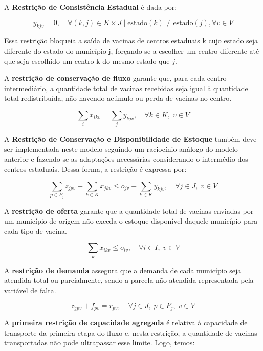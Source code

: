 A \textbf{Restrição de Consistência Estadual} é dada por:

\[
y_{kjv} = 0, \quad \forall (k, j) \in K \times J \mid \text{estado}(k) \neq \text{estado}(j), \forall v \in V
\]

Essa restrição bloqueia a saída de vacinas de centros estaduais {k} cujo estado seja diferente do estado do município {j}, forçando-se a escolher um centro diferente até que seja escolhido um centro {k} do mesmo estado que $j$.

A \textbf{restrição de conservação de fluxo} garante que, para cada centro intermediário, a quantidade total de vacinas recebidas seja igual à quantidade total redistribuída, não havendo acúmulo ou perda de vacinas no centro.

\begin{equation*}
\sum_{i} x_{ikv} = \sum_{j} y_{kjv}, \quad \forall k \in K,\; v \in V
\end{equation*}

A \textbf{Restrição de Conservação e Disponibilidade de Estoque} também deve ser implementada neste modelo seguindo um raciocínio análogo do modelo anterior e fazendo-se as adaptações necessárias considerando o intermédio dos centros estaduais. Dessa forma, a restrição é expressa por:

\begin{equation*}
\sum_{p \in P_j} z_{jpv} + \sum_{k \in K} x_{jkv} \le o_{jv} + \sum_{k \in K} y_{kjv}, \quad \forall j \in J, \; v \in V
\end{equation*}

A \textbf{restrição de oferta} garante que a quantidade total de vacinas enviadas por um município de origem não exceda o estoque disponível daquele município para cada tipo de vacina.

\begin{equation*}
\sum_{k} x_{ikv} \le o_{iv}, \quad \forall i \in I,\; v \in V
\end{equation*}

A \textbf{restrição de demanda} assegura que a demanda de cada município seja atendida total ou parcialmente, sendo a parcela não atendida representada pela variável de falta.

\begin{equation*}
z_{jpv} + f_{pv} = r_{pv}, \quad \forall j \in J,\; p \in P_j,\; v \in V
\end{equation*}

A \textbf{primeira restrição de capacidade agregada} é relativa à capacidade de transporte da primeira etapa do fluxo e, nesta restrição, a quantidade de vacinas transportadas não pode ultrapassar esse limite. Logo, temos:

